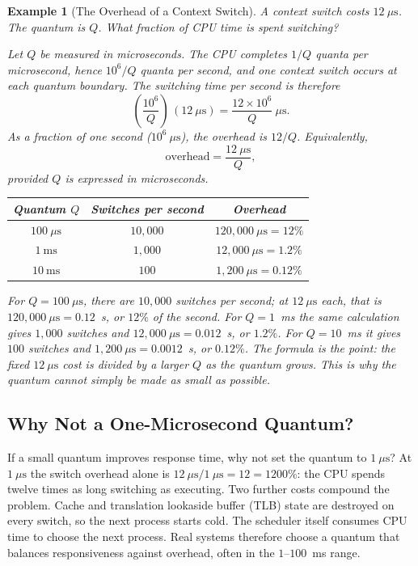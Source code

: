 \documentclass[11pt]{article}
\newtheorem{example}{Example}[section]
\begin{document}
\begin{example}[The Overhead of a Context Switch]
\label{ex:quantum}
A context switch costs $12\ \mu\text{s}$. The quantum is $Q$. What fraction of
CPU time is spent switching?

Let $Q$ be measured in microseconds. The CPU completes $1/Q$ quanta per
microsecond, hence $10^6/Q$ quanta per second, and one context switch occurs at
each quantum boundary. The switching time per second is therefore
\[
  \left(\frac{10^6}{Q}\right)\,(12\ \mu\text{s})
  = \frac{12\times 10^6}{Q}\ \mu\text{s}.
\]
As a fraction of one second ($10^6\ \mu\text{s}$), the overhead is $12/Q$.
Equivalently,
\[
  \text{overhead} = \frac{12\ \mu\text{s}}{Q},
\]
provided $Q$ is expressed in microseconds.

\begin{center}
\renewcommand{\arraystretch}{1.35}
\begin{tabular}{c|c|c}
  \textbf{Quantum $Q$} & \textbf{Switches per second} & \textbf{Overhead} \\
  \hline
  $100\ \mu\text{s}$ & $10{,}000$ & $120{,}000\ \mu\text{s} = 12\%$ \\
  $1\ \text{ms}$     & $1{,}000$  & $12{,}000\ \mu\text{s} = 1.2\%$ \\
  $10\ \text{ms}$    & $100$      & $1{,}200\ \mu\text{s} = 0.12\%$ \\
\end{tabular}
\end{center}

For $Q=100\ \mu\text{s}$, there are $10{,}000$ switches per second; at
$12\ \mu\text{s}$ each, that is $120{,}000\ \mu\text{s}=0.12$~s, or $12\%$ of
the second. For $Q=1$~ms the same calculation gives $1{,}000$ switches and
$12{,}000\ \mu\text{s}=0.012$~s, or $1.2\%$. For $Q=10$~ms it gives $100$
switches and $1{,}200\ \mu\text{s}=0.0012$~s, or $0.12\%$. The formula is the
point: the fixed $12\ \mu\text{s}$ cost is divided by a larger $Q$ as the
quantum grows. This is why the quantum cannot simply be made as small as
possible.
\end{example}

\subsection{Why Not a One-Microsecond Quantum?}

If a small quantum improves response time, why not set the quantum to
$1\ \mu\text{s}$? At $1\ \mu\text{s}$ the switch overhead alone is
$12\ \mu\text{s}/1\ \mu\text{s}=12=1200\%$: the CPU spends twelve times as long
switching as executing. Two further costs compound the problem. Cache and
translation lookaside buffer (TLB) state are destroyed on every switch, so the
next process starts cold. The scheduler itself consumes CPU time to choose the
next process. Real systems therefore choose a quantum that balances
responsiveness against overhead, often in the $1$--$100$~ms range.
\end{document}
